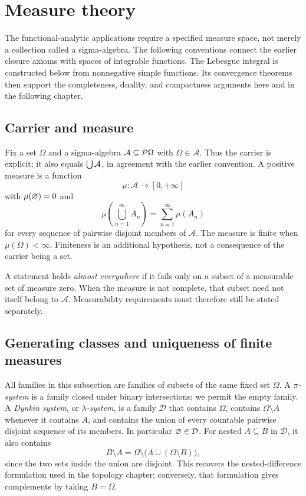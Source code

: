 \def\topic{Measure theory}

\section{Measure theory}
The functional-analytic applications require a specified measure space,
not merely a collection called a sigma-algebra. The following conventions
connect the earlier closure axioms with spaces of integrable functions.
The Lebesgue integral is constructed below from nonnegative simple
functions. Its convergence theorems then support the completeness,
duality, and compactness arguments here and in the following chapter.

\subsection{Carrier and measure}
Fix a set $\Omega$ and a sigma-algebra $\mathcal{A}\subseteq\mathcal{P}\Omega$
with $\Omega\in\mathcal{A}$. Thus the carrier is explicit; it also equals
$\bigcup\mathcal{A}$, in agreement with the earlier convention.
A positive measure is a function
\[
\mu:\mathcal{A}\longrightarrow[0,+\infty]
\]
with $\mu(\varnothing)=0$ and
\[
\mu\left(\bigcup_{n=1}^{\infty}A_n\right)
 =\sum_{n=1}^{\infty}\mu(A_n)
\]
for every sequence of pairwise disjoint members of $\mathcal{A}$.
The measure is finite when $\mu(\Omega)<\infty$.
Finiteness is an additional hypothesis, not a consequence of the carrier
being a set.

A statement holds \emph{almost everywhere} if it fails only on a subset
of a measurable set of measure zero. When the measure is not complete,
that subset need not itself belong to $\mathcal{A}$. Measurability
requirements must therefore still be stated separately.

\subsection{Generating classes and uniqueness of finite measures}
All families in this subsection are families of subsets of the same
fixed set $\Omega$. A \emph{$\pi$-system} is a family closed under
binary intersections; we permit the empty family. A \emph{Dynkin
system}, or \emph{$\lambda$-system}, is a family $\mathcal D$ that
contains $\Omega$, contains $\Omega\setminus A$ whenever it contains
$A$, and contains the union of every countable pairwise disjoint
sequence of its members. In particular $\varnothing\in\mathcal D$.
For nested $A\subseteq B$ in $\mathcal D$, it also contains
\[
B\setminus A
=\Omega\setminus\bigl(A\cup(\Omega\setminus B)\bigr),
\]
since the two sets inside the union are disjoint. This recovers the
nested-difference formulation used in the topology chapter; conversely,
that formulation gives complements by taking $B=\Omega$.

